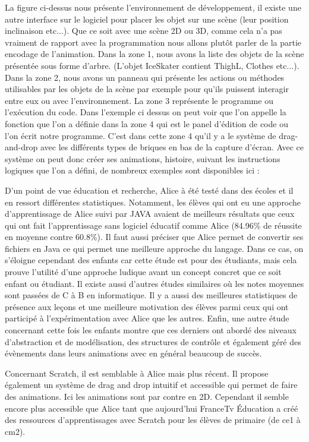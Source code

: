 La figure ci-dessus nous présente l'environnement de développement, il existe une autre interface sur le logiciel pour placer les objet sur une scène (leur position inclinaison etc...). Que ce soit avec une scène 2D ou 3D, comme cela n'a pas vraiment de rapport avec la programmation nous allons plutôt parler de la partie encodage de l'animation. Dans la zone 1, nous avons la liste des objets de la scène présentée sous forme d'arbre. (L'objet IceSkater contient ThighL, Clothes etc...). Dans la zone 2, nous avons un panneau qui présente les actions ou méthodes utilisables par les objets de la scène par exemple pour qu'ils puissent interagir entre eux ou avec l'environnement. La zone 3 représente le programme ou l'exécution du code. Dans l'exemple ci dessus on peut voir que l'on appelle la fonction que l'on a définie dans la zone 4 qui est le panel d'édition de code ou l'on écrit notre programme. C'est dans cette zone 4 qu'il y a le système de drag-and-drop avec les différents types de briques en bas de la capture d'écran. Avec ce système on peut donc créer ses animations, histoire, suivant les instructions logiques que l'on a défini, de nombreux exemples sont disponibles ici : \cite{22}

D'un point de vue éducation et recherche, Alice à été testé dans des écoles et il en ressort différentes statistiques. Notamment, les élèves qui ont eu une approche d'apprentissage de Alice suivi par JAVA avaient de meilleurs résultats que ceux qui ont fait l'apprentissage sans logiciel éducatif comme Alice (84.96\% de réussite en moyenne contre 60.8\%). \cite{23} Il faut aussi préciser que Alice permet de convertir ses fichiers en Java ce qui permet une meilleure approche du langage. Dans ce cas, on s'éloigne cependant des enfants car cette étude est pour des étudiants, mais cela prouve l'utilité d'une approche ludique avant un concept concret que ce soit enfant ou étudiant. Il existe aussi d'autres études similaires où les notes moyennes sont passées de C à B en informatique. Il y a aussi des meilleures statistiques de présence aux leçons et une meilleure motivation des élèves parmi ceux qui ont participé à l'expérimentation avec Alice que les autres. \cite{24} Enfin, une autre étude concernant cette fois les enfants montre que ces derniers ont abordé des niveaux d'abstraction et de modélisation, des structures de contrôle et également géré des évènements dans leurs animations avec en général beaucoup de succès. \cite{35}

\newpage

Concernant Scratch, il est semblable à Alice mais plus récent. Il propose également un système de drag and drop intuitif et accessible qui permet de faire des animations. Ici les animations sont par contre en 2D. Cependant il semble encore plus accessible que Alice tant que aujourd'hui FranceTv Éducation a créé des ressources d'apprentissages avec Scratch pour les élèves de primaire (de ce1 à cm2). \cite{25}


